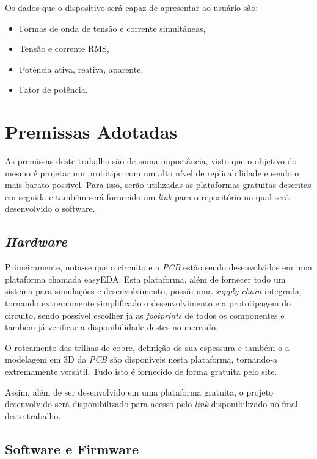Os dados que o dispositivo será capaz de apresentar ao usuário são:

\begin{itemize}
    \item Formas de onda de tensão e corrente simultâneas,
    \item Tensão e corrente RMS,
    \item Potência ativa, reativa, aparente,
    \item Fator de potência.
\end{itemize}

\section{Premissas Adotadas}\label{premissas1}

As premissas deste trabalho são de suma importância, visto que o objetivo do mesmo é projetar um protótipo com um alto nível de replicabilidade e sendo o mais barato possível. Para isso, serão utilizadas as plataformas gratuitas descritas em seguida e também será fornecido um \textit{link} para o repositório no qual será desenvolvido o software.

\subsection{\textit{Hardware}}\label{proto}

Primeiramente, nota-se que o circuito e a \textit{\gls{PCB}} estão sendo desenvolvidos em uma plataforma chamada easyEDA. Esta plataforma, além de fornecer todo um sistema para simulações e desenvolvimento, possúi uma \textit{supply chain} integrada, tornando extremamente simplificado o desenvolvimento e a prototipagem do circuito, sendo possível escolher já as \textit{footprints} de todos os componentes e também já verificar a disponibilidade destes no mercado.

O roteamento das trilhas de cobre, definição de sua espessura e também o a modelagem em 3D da \textit{\gls{PCB}} são disponíveis nesta plataforma, tornando-a extremamente versátil. Tudo isto é fornecido de forma gratuita pelo site.

Assim, além de ser desenvolvido em uma plataforma gratuita, o projeto desenvolvido será disponibilizado para acesso pelo \textit{link} disponibilizado no final deste trabalho.

\subsection{Software e Firmware}\label{softw}


